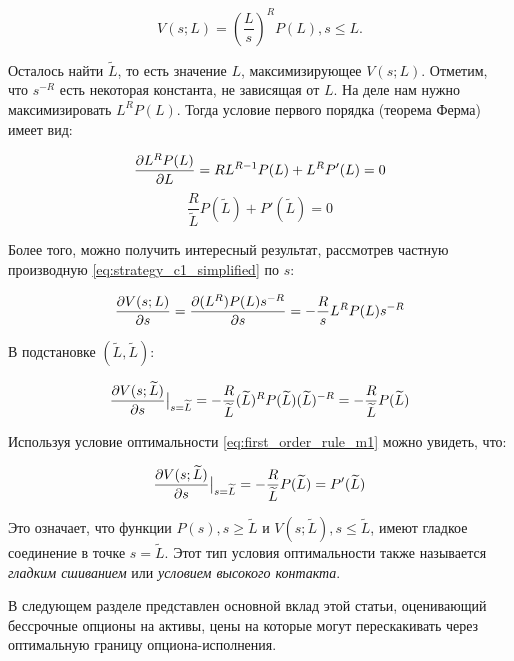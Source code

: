 \documentclass[a4paper,12pt]{article}
\theoremstyle{definition}
\newcommand{\at}[2][]{#1|_{#2}}
\begin{document}
\begin{equation}\label{eq:strategy_c1_simplified}
V(s; L) = \left(\frac{L}{s}\right)^{R} P(L), s \le L.
\end{equation}

Осталось найти $\widetilde{L}$, то есть значение $L$, максимизирующее $V(s; L)$. Отметим, что $s^{-R}$ есть некоторая константа, не зависящая от $L$. На деле нам нужно максимизировать $L^{R} P(L)$. Тогда условие первого порядка (теорема Ферма) имеет вид:

\begin{equation*}
    \pdv{L^{R} P(L)}{L} = R L^{R - 1} P(L) + L^R P'(L) = 0
\end{equation*}
\begin{equation}\label{eq:first_order_rule_m1}
    \frac{R}{\widetilde{L}} P(\widetilde{L}) + P'(\widetilde{L}) = 0
\end{equation}

Более того, можно получить интересный результат, рассмотрев частную производную \eqref{eq:strategy_c1_simplified} по $s$:

\begin{equation*}
    \pdv{V(s; L)}{s} = \pdv{(L^R) P(L) s^{-R}}{s} = -\frac{R}{s} L^R P(L) s^{-R}
\end{equation*}

В подстановке $(\widetilde{L}, \widetilde{L})$:

\begin{equation*}
    \pdv{V(s; \widetilde{L})}{s}\at[\big]{s=\widetilde{L}} = -\frac{R}{\widetilde{L}} (\widetilde{L})^R P(\widetilde{L}) (\widetilde{L})^{-R} = -\frac{R}{\widetilde{L}} P(\widetilde{L})
\end{equation*}

Используя условие оптимальности \eqref{eq:first_order_rule_m1} можно увидеть, что:

\begin{equation}\label{eq:smooth_pasting_condition_m1}
    \pdv{V(s; \widetilde{L})}{s}\at[\big]{s=\widetilde{L}} = -\frac{R}{\widetilde{L}} P(\widetilde{L}) = P'(\widetilde{L})
\end{equation}

Это означает, что функции $P(s), s \ge \widetilde{L}$ и $V(s; \widetilde{L}), s \le \widetilde{L}$, имеют гладкое соединение в точке $s = \widetilde{L}$. Этот тип условия оптимальности также называется \textit{гладким сшиванием} или \textit{условием высокого контакта}.

В следующем разделе представлен основной вклад этой статьи, оценивающий бессрочные опционы на активы, цены на которые могут перескакивать через оптимальную границу опциона-исполнения.
\end{document}
